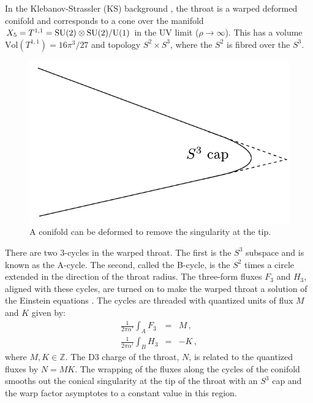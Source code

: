 
In the Klebanov-Strassler (KS) background \cite{ks}, the throat 
is a warped deformed conifold and 
corresponds to a cone over the manifold 
$X_5 = T^{1,1}= {\rm SU(2)} \otimes {\rm SU(2)}/{\rm U(1)}$
in the UV limit ($\rho \rightarrow \infty$). This has   
a volume $\mathrm{Vol} (T^{1,1}) = 16\pi^3/27$ and  topology
$S^2\times S^3$, where the $S^2$ is fibred over the $S^3$.

\begin{figure}
\centering
\includegraphics{dbi/graphs/deformed-conifold}   
\caption{A conifold can be deformed to remove the singularity at the tip.}
\label{fig:conifold-dbiintro}
\end{figure}

There are two 3-cycles in the warped throat. The first is the $S^3$ subspace and
is known as the A-cycle. The second, called the B-cycle, is the $S^2$ times a
circle extended in the direction of the throat radius. The three-form fluxes
$F_3$ and $H_3$, aligned with these cycles, are turned on to make the warped
throat a solution of the Einstein equations \cite{cline}. The cycles are threaded with
quantized units of flux $M$ and $K$ given by: 
\begin{eqnarray}
\label{eq:fluxdefn-dbiintro}
 \frac{1}{2\pi\alpha'}\int_A F_3 &=& M \,, \\
 \frac{1}{2\pi\alpha'}\int_B H_3 &=& -K\,, 
\end{eqnarray}
where $M,K\in \mathbb{Z}$.
The D$3$ charge of the throat, $N$, is related to the quantized fluxes by
$N=MK$.
The wrapping of the fluxes along the cycles of the conifold smooths out the
conical singularity at the tip of the throat with an $S^3$ cap 
\cite{ks,kt} and the warp factor asymptotes to 
a constant value in this region.


